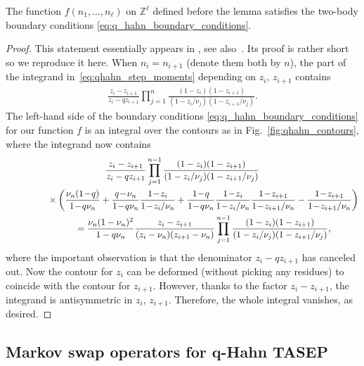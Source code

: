 \begin{Lemma}
	\label{lemma:boundary_conditions}
	The function $f(n_1,\ldots,n_\ell )$ on $\mathbb{Z}^{\ell}$ defined before the lemma
	satisfies the two-body boundary conditions
	\eqref{eq:q_hahn_boundary_conditions}.
\end{Lemma}
\begin{proof}
	This statement essentially appears in
	\cite{Corwin2014qmunu}, see also~\cite{BorodinCorwinSasamoto2012}.
	Its proof is rather short so we reproduce it here.
	When $n_i=n_{i+1}$ (denote them both by $n$),
	the part of the integrand in~\eqref{eq:qhahn_step_moments} depending on
	$z_i$, $z_{i+1}$ contains
	\begin{gather*}
		\frac{z_i-z_{i+1}}{z_i-qz_{i+1}}
		\prod_{j=1}^{n}\frac{(1-z_i)(1-z_{i+1})}{(1-z_i/\nu_j)(1-z_{i+1}/\nu_j)}.
	\end{gather*}
	The left-hand side of the boundary conditions
	\eqref{eq:q_hahn_boundary_conditions} for our function $f$
	is an integral over the contours as in Fig.~\ref{fig:qhahn_contours}, where the integrand now contains
	\begin{gather*}
	\frac{z_i-z_{i+1}}{z_i-qz_{i+1}}
	\prod_{j=1}^{n-1}\frac{(1-z_i)(1-z_{i+1})}{(1-z_i/\nu_j)(1-z_{i+1}/\nu_j)}
	\\ \hphantom{\frac{z_i-z_{i+1}}{z_i-qz_{i+1}}}
	{}\times
	\bigg(\frac{\nu_n(1\!-\!q)}{1\!-\!q \nu_n}+\frac{q\!-\!\nu_n}{1\!-\!q \nu_n}\frac{1\!-\!z_i}{1\!-\!z_i/\nu_n}
	+\frac{1\!-\!q}{1\!-\!q \nu_n}\frac{1\!-\!z_i}{1\!-\!z_i/\nu_n}\frac{1\!-\!z_{i+1}}{1\!-\!z_{i+1}/\nu_n}
	-\frac{1\!-\!z_{i+1}}{1\!-\!z_{i+1}/\nu_n}\bigg)
	\\ \hphantom{\frac{z_i-z_{i+1}}{z_i-qz_{i+1}}}
{}=\frac{\nu_n(1-\nu_n)^2}{1-q\nu_n}
	\frac{z_i-z_{i+1}}{(z_i-\nu_n)(z_{i+1}-\nu_n)}
	\prod_{j=1}^{n-1}\frac{(1-z_i)(1-z_{i+1})}{(1-z_i/\nu_j)(1-z_{i+1}/\nu_j)},
	\end{gather*}
	where the important observation is that
	the denominator $z_i-qz_{i+1}$ has
	canceled out. Now the contour for $z_{i}$ can be deformed
	(without picking any residues) to coincide with the contour for $z_{i+1}$.
	However, thanks to the factor $z_i-z_{i+1}$, the integrand is antisymmetric in
	$z_i$, $z_{i+1}$. Therefore, the whole integral vanishes, as desired.
\end{proof}

\subsection[Markov swap operators for q-Hahn TASEP]
{Markov swap operators for $\boldsymbol q$-Hahn TASEP}
\label{sub:cond_distr_qhahn}

